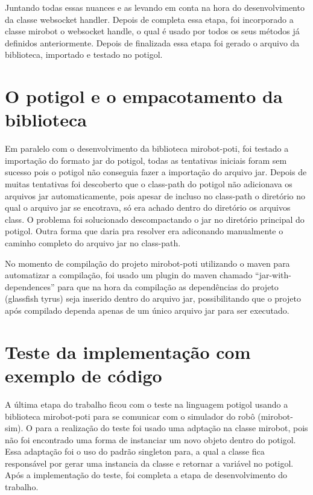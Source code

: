 Juntando todas essas nuances e as levando em conta na hora do desenvolvimento
da classe websocket handler. Depois de completa essa etapa, foi incorporado a
classe mirobot o websocket handle, o qual é usado por todos os seus métodos já
definidos anteriormente. Depois de finalizada essa etapa foi gerado o arquivo
da biblioteca, importado e testado no potigol.

\section{O potigol e o empacotamento da biblioteca}
\label{sec:empacotamento}

Em paralelo com o desenvolvimento da biblioteca mirobot-poti, foi testado a
importação do formato jar do potigol, todas as tentativas iniciais foram sem
sucesso pois o potigol não conseguia fazer a importação do arquivo jar. Depois
de muitas tentativas foi descoberto que o class-path do potigol não adicionava
os arquivos jar automaticamente, pois apesar de incluso no class-path o
diretório no qual o arquivo jar se encotrava, só era achado dentro do diretório
os arquivos class. O problema foi solucionado descompactando o jar no diretório
principal do potigol. Outra forma que daria pra resolver era adiconando
manualmente o caminho completo do arquivo jar no class-path.

No momento de compilação do projeto mirobot-poti utilizando o maven para
automatizar a compilação, foi usado um plugin do maven chamado
``jar-with-dependences'' para que na hora da compilação as dependências do
projeto (glassfish tyrus) seja inserido dentro do arquivo jar, possibilitando
que o projeto após compilado dependa apenas de um único arquivo jar para ser
executado.

\section{Teste da implementação com exemplo de código}
\label{sec:testemirobot}

A última etapa do trabalho ficou com o teste na linguagem potigol usando a
biblioteca mirobot-poti para se comunicar com o simulador do robô
(mirobot-sim). O para a realização do teste foi usado uma adptação na classe
mirobot, pois não foi encontrado uma forma de instanciar um novo objeto dentro
do potigol. Essa adaptação foi o uso do padrão singleton para, a qual a classe
fica responsável por gerar uma instancia da classe e retornar a variável no
potigol. Após a implementação do teste, foi completa a etapa de desenvolvimento
do trabalho.

